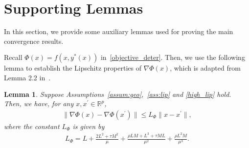 \documentclass{osudissert96}
\newtheorem{lemma}{Lemma}
\begin{document}
%


\section{Supporting Lemmas}
In this section, we provide some auxiliary lemmas used for proving the main convergence results. 

Recall $\Phi(x)=f(x,y^*(x))$ in~\cref{objective_deter}. Then, we use 
the following lemma to establish the Lipschitz properties of $\nabla \Phi(x)$, which is adapted from Lemma 2.2 in~\cite{ghadimi2018approximation}.
\begin{lemma}\label{le:lipphi}
Suppose Assumptions~\ref{assum:geo},~\ref{ass:lip} and \ref{high_lip} hold. Then, we have, for any $x,x^\prime\in\mathbb{R}^p$,  
\begin{align*}
\|\nabla \Phi(x)- \nabla \Phi(x^\prime)\| \leq L_\Phi \|x-x^\prime\|,
\end{align*}
where the constant $L_\Phi$ is given by
\begin{align}
L_\Phi = L + \frac{2L^2+\tau M^2}{\mu} + \frac{\rho L M+L^3+\tau M L}{\mu^2} + \frac{\rho L^2 M}{\mu^3}.%
\end{align}
\end{lemma}
\end{document}
